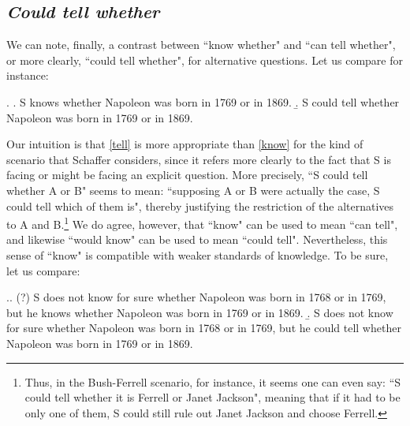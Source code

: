 \subsection{\emph{Could tell whether}}

We can note, finally, a contrast between ``know whether" and ``can
tell whether", or more clearly, ``could tell whether", for
alternative questions. Let us compare for instance:

\ex. \a.\label{know} S knows whether Napoleon was born in 1769 or
in 1869. \b.\label{tell} S could tell whether Napoleon was born in
1769 or in 1869.

Our intuition is that \ref{tell} is more appropriate than
\ref{know} for the kind of scenario that Schaffer considers, since
it refers more clearly to the fact that S is facing or might be
facing an explicit question. More precisely, ``S could tell
whether A or B" seems to mean: ``supposing A or B were actually
the case, S could tell which of them is", thereby justifying the
restriction of the alternatives to A and B.\footnote{Thus, in the
Bush-Ferrell scenario, for instance, it seems one can even say:
``S could tell whether it is Ferrell or Janet Jackson", meaning
that if it had to be only one of them, S could still rule out
Janet Jackson and choose Ferrell.} We do agree, however, that
``know" can be used to mean ``can tell", and likewise ``would
know" can be used to mean ``could tell". Nevertheless, this sense
of ``know" is compatible with weaker standards of knowledge. To be
sure, let us compare:


\ex.\a. (?) S does not know for sure whether Napoleon was born in
1768 or in 1769, but he knows whether Napoleon was born in 1769 or
in 1869. \b. S does not know for sure whether Napoleon was born in
1768 or in 1769, but he could tell whether Napoleon was born in
1769 or in 1869.


%

